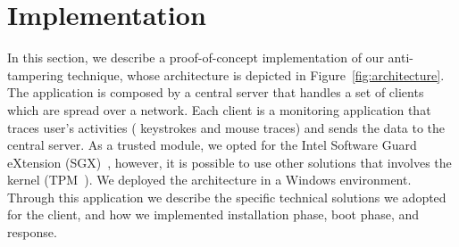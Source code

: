 \section{Implementation}
\label{sec:implementation}
In this section, we describe a proof-of-concept implementation of our 
anti-tampering
technique, whose architecture is depicted in Figure~\ref{fig:architecture}.
The application is composed by a central server that handles a set of clients 
which are spread over a network.
Each client is a monitoring application that traces user's activities (\ie 
keystrokes and mouse traces) and sends the
data to the central server.
As a trusted module, we opted for the Intel Software Guard eXtension 
(SGX)~\cite{rozas2013intel}, however, it is possible to use other solutions 
that involves the kernel (\eg TPM~\cite{tpm-isoosi}).
We deployed the architecture in a Windows environment.
Through this application we describe the specific technical solutions we 
adopted for the client, and how we implemented installation phase, boot phase, 
and response. 
